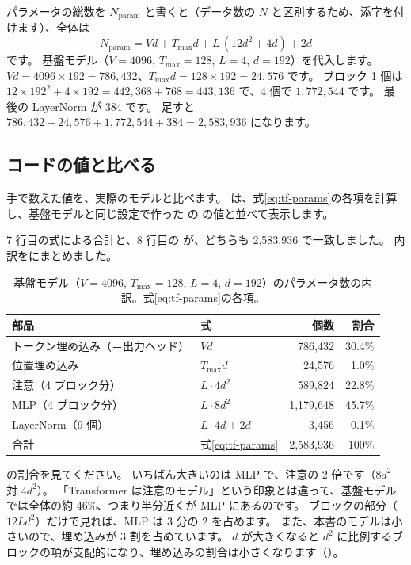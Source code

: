 パラメータの総数を $N_{\text{param}}$ と書くと（データ数の $N$ と区別するため、添字を付けます）、全体は
\begin{equation}
N_{\text{param}} = Vd + T_{\max}d + L\,(12d^2+4d) + 2d
\label{eq:tf-params}
\end{equation}
です。
基盤モデル（$V=4096$, $T_{\max}=128$, $L=4$, $d=192$）を代入します。
$Vd=4096\times192=786{,}432$、$T_{\max}d=128\times 192=24{,}576$ です。
ブロック 1 個は $12\times192^2+4\times192=442{,}368+768=443{,}136$ で、4 個で $1{,}772{,}544$ です。
最後の LayerNorm が $384$ です。
足すと $786{,}432+24{,}576+1{,}772{,}544+384=2{,}583{,}936$ になります。

\subsection*{コードの値と比べる}

手で数えた値を、実際のモデルと比べます。
 は、式\eqref{eq:tf-params}の各項を計算し、基盤モデルと同じ設定で作った  の  の値と並べて表示します。


7 行目の式による合計と、8 行目の  が、どちらも 2,583,936 で一致しました。
内訳をにまとめました。

\begin{table}[tbp]
\centering
\caption{基盤モデル（$V=4096$, $T_{\max}=128$, $L=4$, $d=192$）のパラメータ数の内訳。式\eqref{eq:tf-params}の各項。}
\label{tab:tf-params}
\small
\begin{tabular}{llrr}
\toprule
部品 & 式 & 個数 & 割合 \\
\midrule
トークン埋め込み（＝出力ヘッド） & $Vd$ & 786,432 & 30.4\% \\
位置埋め込み & $T_{\max}d$ & 24,576 & 1.0\% \\
注意（4 ブロック分） & $L\cdot 4d^2$ & 589,824 & 22.8\% \\
MLP（4 ブロック分） & $L\cdot 8d^2$ & 1,179,648 & 45.7\% \\
LayerNorm（9 個） & $L\cdot 4d+2d$ & 3,456 & 0.1\% \\
\midrule
合計 & 式\eqref{eq:tf-params} & 2,583,936 & 100\% \\
\bottomrule
\end{tabular}
\end{table}

の割合を見てください。
いちばん大きいのは MLP で、注意の 2 倍です（$8d^2$ 対 $4d^2$）。
「Transformer は注意のモデル」という印象とは違って、基盤モデルでは全体の約 46\%、つまり半分近くが MLP にあるのです。
ブロックの部分（$12Ld^2$）だけで見れば、MLP は 3 分の 2 を占めます。
また、本書のモデルは小さいので、埋め込みが 3 割を占めています。
$d$ が大きくなると $d^2$ に比例するブロックの項が支配的になり、埋め込みの割合は小さくなります（）。


